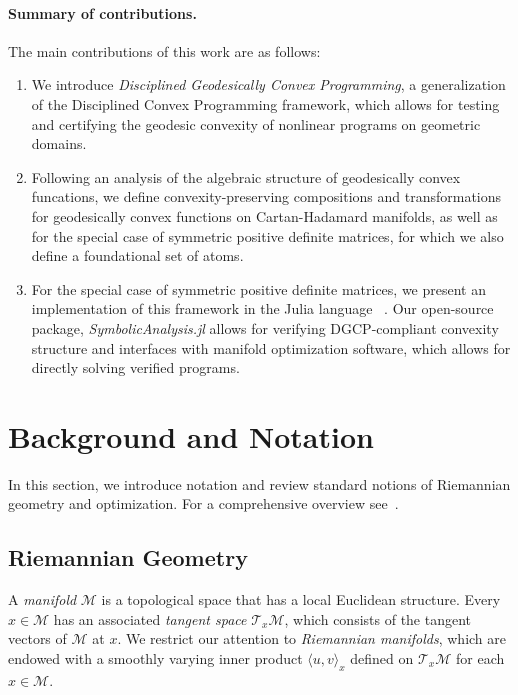 \documentclass[twoside,11pt]{article}
\begin{document}
\paragraph{Summary of contributions.}
The main contributions of this work are as follows:
\begin{enumerate}
    \item We introduce \emph{Disciplined Geodesically Convex Programming}, a generalization of the Disciplined Convex Programming framework, which allows for testing and certifying the geodesic convexity of nonlinear programs on geometric domains.
    \item Following an analysis of the algebraic structure of geodesically convex funcations, we define convexity-preserving compositions and transformations for geodesically convex functions on Cartan-Hadamard manifolds, as well as for the special case of symmetric positive definite matrices, for which we also define a foundational set of atoms.
    \item For the special case of symmetric positive definite matrices, we present an implementation of this framework in the Julia language ~\citep{bezanson2017julia}. Our open-source package, \textsl{SymbolicAnalysis.jl} allows for verifying DGCP-compliant convexity structure and interfaces with  manifold optimization software, which allows for directly solving verified programs.
\end{enumerate}


\section{Background and Notation}
In this section, we introduce notation and review standard notions of Riemannian geometry and optimization. For a comprehensive overview see~\citep{boumal2020introduction,bacak2014convex}.

\subsection{Riemannian Geometry}
A \textit{manifold} $\mathcal{M}$ is a topological space that has a local Euclidean structure. Every $x \in \mathcal{M}$ has an associated \textit{tangent space} $\mathcal{T}_x \mathcal{M}$, which consists of the tangent vectors of $\mathcal{M}$ at $x$. We restrict our attention to \textit{Riemannian manifolds}, which are endowed with a smoothly varying inner product $\langle u, v \rangle_x$ defined on $\mathcal{T}_x \mathcal{M}$ for each $x \in \mathcal{M}$. 
\end{document}
